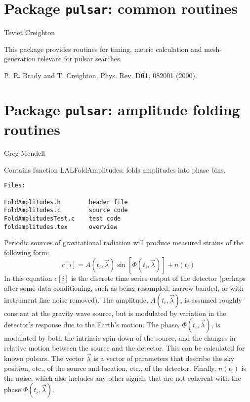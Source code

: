 \chapter{Package \texttt{pulsar}: common routines}
Teviet Creighton
\bigskip

This package provides routines for timing, metric calculation and
mesh-generation relevant for pulsar searches.

\newpage
\newpage
\newpage
\newpage
\newpage
\newpage

\newpage\begin{thebibliography}{0}
  P.~R. Brady and T. Creighton, Phys. Rev. D\textbf{61}, 082001
  (2000).
\end{thebibliography}

\chapter{Package \texttt{pulsar}: amplitude folding routines}
Greg Mendell
\bigskip

Contains function LALFoldAmplitudes: folds amplitudes into phase bins.

\begin{verbatim}
Files:

FoldAmplitudes.h        header file
FoldAmplitudes.c        source code
FoldAmplitudesTest.c    test code
foldamplitudes.tex      overview
\end{verbatim}

Periodic sources of gravitational radiation will produce measured strains of the following form:
$$
c[i] = A(t_i,\vec{\lambda}) \sin[\Phi(t_i,\vec{\lambda})] + n(t_i)
$$
In this equation $c[i]$ is the discrete time series output of the detector (perhaps after some data conditioning, such as
being resampled, narrow banded, or with instrument line noise removed).
The amplitude, $A(t_i,\vec{\lambda})$, is assumed roughly constant at the gravity wave source,
but is modulated by variation in the detector's response due to the Earth's motion.  The phase, $\Phi(t_i,\vec{\lambda})$,
is modulated by both the intrinsic spin down of the source, and the changes in relative motion between the source
and the detector.  This can be calculated for known pulsars.  The vector $\vec{\lambda}$ is a vector of parameters
that describe the sky position, etc., of the source and location, etc., of the detector.
Finally, $n(t_i)$ is the noise, which also includes any other signals that are not coherent with
the phase $\Phi(t_i,\vec{\lambda})$.


